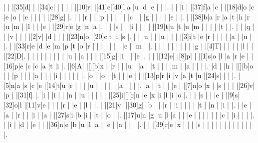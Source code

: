 \documentclass[12pt]{article}
\begin{document}
\begin{Puzzle}{22}{24}
  |{}  |{}  |[35]d|{}  |{}  |[34]c|{}  |{}  |{}  |{}  |{}  |[10]r|{}  |[41]c|[40]l|a   |u   |d   |e   |{}  |{}  |.
  |{}  |{}  |i   |{}  |[37]f|a   |c   |{}  |[18]d|o   |c   |e   |o   |{}  |e   |{}  |{}  |{}  |{}  |[28]g|{}  |.
  |{}  |{}  |r   |{}  |{}  |p   |{}  |{}  |{}  |{}  |{}  |c   |{}  |{}  |g   |{}  |{}  |{}  |{}  |e   |{}  |.
  |{}  |[38]b|a   |r   |a   |t   |h   |r   |u   |m   |{}  |l   |{}  |{}  |e   |{}  |[29]r|e   |g   |n   |a   |.
  |{}  |{}  |s   |{}  |{}  |i   |{}  |{}  |{}  |{}  |[19]t|u   |t   |u   |m   |{}  |{}  |{}  |{}  |t   |{}  |.
  |{}  |{}  |q   |{}  |{}  |v   |{}  |{}  |{}  |[2]v|{}  |d   |{}  |{}  |{}  |[23]n|o   |[20]c|t   |i   |s   |.
  |{}  |{}  |u   |{}  |{}  |u   |{}  |{}  |{}  |[3]i|t   |e   |r   |{}  |{}  |{}  |{}  |a   |{}  |u   |{}  |.
  |{}  |[33]r|e   |d   |e   |m   |p   |t   |o   |r   |{}  |{}  |{}  |{}  |{}  |{}  |{}  |e   |{}  |m   |{}  |.
  |{}  |{}  |{}  |{}  |{}  |{}  |{}  |{}  |{}  |g   |{}  |[4]T|{}  |{}  |{}  |{}  |{}  |l   |{}  |{}  |[22]D|.
  |{}  |{}  |{}  |{}  |{}  |{}  |{}  |{}  |{}  |u   |{}  |a   |{}  |{}  |{}  |[15]g|{}  |i   |{}  |{}  |e   |.
  |{}  |{}  |[12]e|{}  |[8]p|{}  |{}  |[1]s|o   |l   |a   |r   |e   |{}  |[16]p|e   |c   |c   |a   |t   |i   |.
  |[6]A|{}  |[][b]x   |{}  |r   |{}  |{}  |u   |{}  |a   |{}  |t   |{}  |{}  |{}  |m   |{}  |a   |{}  |{}  |{}  |.
  |d   |{}  |h   |{}  |[][b]o   |{}  |{}  |p   |{}  |{}  |{}  |a   |{}  |{}  |{}  |i   |{}  |{}  |{}  |{}  |{}  |.
  |o   |{}  |o   |{}  |t   |{}  |{}  |e   |{}  |{}  |[13]p|r   |i   |v   |a   |t   |u   |[24]s|{}  |{}  |{}  |.
  |[5]n|a   |s   |c   |e   |[14]t|u   |r   |{}  |{}  |{}  |u   |{}  |{}  |{}  |{}  |{}  |a   |{}  |{}  |{}  |.
  |a   |{}  |t   |{}  |{}  |e   |{}  |[7]n|o   |x   |{}  |s   |{}  |{}  |{}  |[26]v|{}  |p   |{}  |[31]f|{}  |.
  |i   |{}  |i   |{}  |{}  |n   |{}  |u   |{}  |{}  |{}  |{}  |{}  |[25]i|[][r]n   |e   |x   |i   |l   |i   |o   |.
  |{}  |{}  |s   |{}  |{}  |e   |{}  |[9]s|[32]o|l   |[11]v|e   |{}  |{}  |{}  |r   |{}  |e   |{}  |l   |{}  |.
  |{}  |[21]v|{}  |[30]g|{}  |b   |{}  |{}  |r   |{}  |i   |{}  |{}  |{}  |{}  |t   |{}  |n   |{}  |i   |{}  |.
  |{}  |e   |{}  |a   |{}  |r   |{}  |{}  |i   |{}  |a   |{}  |[27]s|i   |b   |i   |{}  |t   |{}  |o   |{}  |.
  |[17]u|n   |g   |u   |l   |a   |{}  |{}  |e   |{}  |{}  |{}  |{}  |{}  |{}  |c   |{}  |i   |{}  |{}  |{}  |.
  |{}  |i   |{}  |d   |{}  |e   |{}  |{}  |[36]n|e   |b   |u   |l   |a   |{}  |e   |{}  |a   |{}  |{}  |{}  |.
  |{}  |{}  |[39]r|e   |x   |{}  |{}  |{}  |s   |{}  |{}  |{}  |{}  |{}  |{}  |{}  |{}  |{}  |{}  |{}  |{}  |.
\end{Puzzle}
\end{document}
